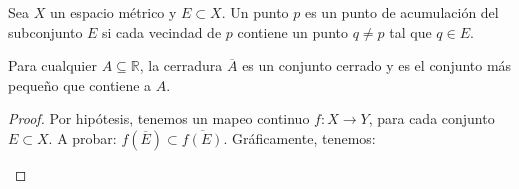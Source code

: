 \begin{tcolorbox}[colback=blue!15,colframe=blue!1!blue,title= Definición (Punto de acumulación) de \cite{rudin1976principles}]
Sea $X$ un espacio métrico y $E\subset X$. 
Un punto $p$ es un punto de acumulación del subconjunto $E$ si cada vecindad de $p$ contiene un punto $q\neq p$ tal que $q\in E$.
\end{tcolorbox}
\begin{tcolorbox}[colback=gray!15,colframe=gray!1!gray,title=  Teorema 3.2.12 de \cite{abbott2012understanding} ]
Para cualquier $A\subseteq \mathbb{R}$, la cerradura $\overline{A}$ es un conjunto cerrado y es el conjunto más pequeño que contiene a $A$.
\end{tcolorbox}
\begin{proof}
Por hipótesis, tenemos un mapeo continuo $f: X\to Y$, para cada conjunto $E\subset X$. A probar: $f(\overline{E})\subset \overline{f(E)}$. Gráficamente, tenemos: 
\begin{center}
    


\begin{tikzpicture}[x=0.75pt,y=0.75pt,yscale=-1,xscale=1]


\end{tikzpicture}
\end{center}
\end{proof}
